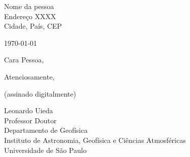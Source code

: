 \documentclass[a4paper,onecolumn,10pt]{article}
\newcommand{\Nome}{Leonardo Uieda}
\newcommand{\Cargo}{Professor Doutor}
\newcommand{\Padding}{\vspace*{0.5cm}}
\begin{document}
\begin{flushleft}
  Nome da pessoa
  \\
  Endereço XXXX
  \\
  Cidade, País, CEP
\end{flushleft}
\begin{flushright}
  \today
\end{flushright}
\Padding

\noindent
Cara Pessoa,
\Padding

\lipsum[1-6]
\Padding

\begin{flushleft}
  Atenciosamente,

  \Padding

  {\color{mediumgray}(assinado digitalmente)}

  \Nome{}
  \\[0.25cm]
  {
    \color{mediumgray}
    \small
    \Cargo
    \\
    Departamento de Geofísica
    \\
    Instituto de Astronomia, Geofísica e Ciências Atmosféricas
    \\
    Universidade de São Paulo
  }
\end{flushleft}
\end{document}
